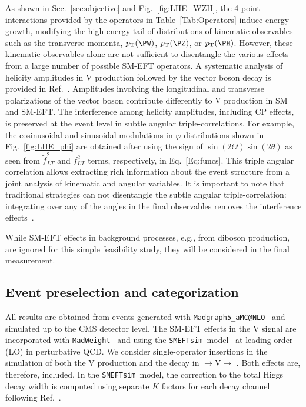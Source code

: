 \documentclass[a4paper,11pt]{article}
\newcommand{\Pb}{{{\Pqb}}\xspace}
\newcommand{\PAb}{{{{\Paqb}}}\xspace}
\renewcommand{\PV}{{{{V}}}\xspace}
\newcommand{\VH}{{{\PV}{\PH}}\xspace}
\newcommand{\pp}{{{\Pp}{\Pp}}\xspace}
\newcommand{\lplp}{{{\Pl}{\Pl}}\xspace}
\begin{document}
As shown in Sec.~\ref{sec:objective} and Fig.~\ref{fig:LHE_WZH}, the 4-point interactions provided by the operators in Table~\ref{Tab:Operators} induce energy growth, modifying the high-energy tail of distributions of kinematic observables such as the transverse momenta, $\pt(\PW)$, $\pt(\PZ)$, or $\pt(\PH)$. 
However, these kinematic observables alone are not sufficient to disentangle the various effects from a large number of possible SM-EFT operators. 
A systematic analysis of helicity amplitudes in \VH production followed by the vector boson decay is provided in Ref.~\cite{Banerjee:2019twi}. 
Amplitudes involving the longitudinal and transverse polarizations of the vector boson contribute differently to \VH production in SM and SM-EFT. 
The interference among helicity amplitudes, including CP effects, is preserved at the event level in subtle angular triple-correlations. 
For example, the cosinusoidal and sinusoidal modulations in $\varphi$ distributions shown in Fig.~\ref{fig:LHE_phi} are obtained after using the sign of $\sin\left(2\Theta\right)\sin\left(2\theta\right)$ as seen from $\tilde{f}^2_{LT}$ and $f^2_{LT}$ terms, respectively, in  Eq.~\ref{Eq:funcs}. 
This triple angular correlation allows extracting rich information about the event structure from a joint analysis of kinematic and angular variables. 
It is important to note that traditional strategies can not disentangle the subtle angular triple-correlation: integrating over any of the angles in the final observables removes the interference effects~\cite{Panico:2017frx}.

While SM-EFT effects in background processes, e.g., from diboson production, are ignored for this simple feasibility study, they will be considered in the final measurement.

\subsection{Event preselection and categorization}

All results are obtained from events generated with \texttt{Madgraph5\_aMC@NLO}~\cite{Alwall:2014hca} and simulated up to the CMS detector level. 
The SM-EFT effects in the \VH signal are incorporated with \texttt{MadWeight}~\cite{Artoisenet:2008zz} and using the \texttt{SMEFTsim}~model~\cite{Brivio:2017btx,Brivio:2020onw} at leading order (LO) in perturbative QCD. 
We consider single-operator insertions in the simulation of both the \VH production and the decay in {\pp$\rightarrow$\VH$\rightarrow$ \lplp \Pb\PAb}. Both effects are, therefore, included. In the \texttt{SMEFTsim}~model, the correction to the total Higgs decay width is computed using separate $K$ factors for each decay channel following Ref.~\cite{Brivio:2019myy}.
\end{document}
